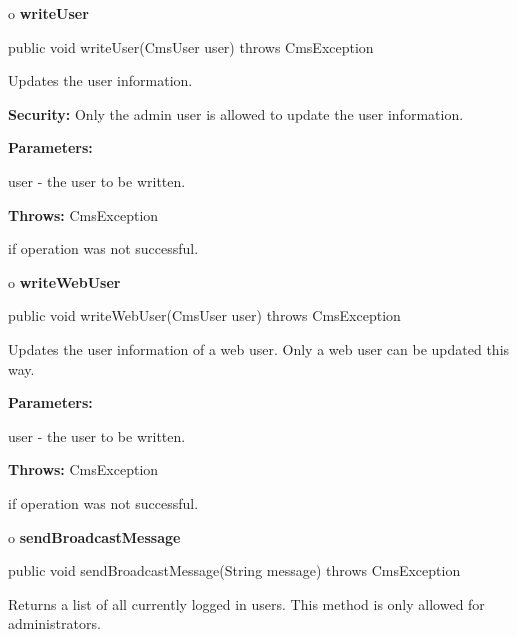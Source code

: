 o {\bf writeUser} 

\begin{PRE}
 public void writeUser(CmsUser user) throws CmsException
\end{PRE}

\begin{description}
\htmlDD Updates the user information. 

{\bf Security:} Only the admin user is allowed to update the user information.


\begin{description}
\item {\bf Parameters:}  

user - the user to be written.  
\item {\bf Throws:} CmsException  

if operation was not successful.  
\end{description}

\end{description}

o {\bf writeWebUser} 

\begin{PRE}
 public void writeWebUser(CmsUser user) throws CmsException
\end{PRE}

\begin{description}
\htmlDD Updates the user information of a web user. \htmlBR
Only a web user can be updated this way. 

\begin{description}
\item {\bf Parameters:}  

user - the user to be written.  
\item {\bf Throws:} CmsException  

if operation was not successful.  
\end{description}

\end{description}

o {\bf sendBroadcastMessage} 

\begin{PRE}
 public void sendBroadcastMessage(String message) throws CmsException
\end{PRE}

\begin{description}
\htmlDD Returns a list of all currently logged in users. This method is only
allowed for administrators. 

\end{description}

